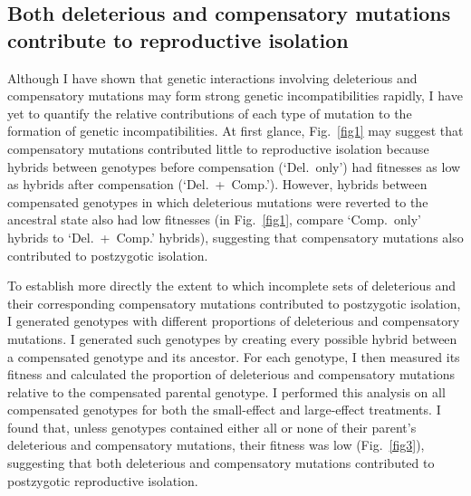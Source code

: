 \begin{doublespace}
\subsection{Both deleterious and compensatory mutations
  contribute to reproductive isolation}

Although I have shown that genetic interactions
involving deleterious and compensatory mutations
may form strong genetic incompatibilities rapidly,
I have yet to quantify the relative contributions
of each type of mutation to the formation of genetic incompatibilities.
%
At first glance, Fig.~\ref{fig1}
may suggest that compensatory mutations
contributed little to reproductive isolation
because hybrids between genotypes before compensation (`Del.~only')
had fitnesses as low as hybrids after compensation (`Del.~+~Comp.').
%
However, hybrids between compensated genotypes in which deleterious mutations
were reverted to the ancestral state also had low fitnesses
(in Fig.~\ref{fig1}, compare `Comp.~only' hybrids to `Del.~+~Comp.' hybrids),
suggesting that compensatory mutations
also contributed to postzygotic isolation.



To establish more directly the extent to which incomplete sets
of deleterious and their corresponding compensatory mutations
contributed to postzygotic isolation,
I generated genotypes with different proportions
of deleterious and compensatory mutations.
%
I generated such genotypes by creating every possible hybrid
between a compensated genotype and its ancestor.
%
For each genotype, I then measured its fitness and calculated
the proportion of deleterious and compensatory mutations
relative to the compensated parental genotype.
%
I performed this analysis on all compensated genotypes
for both the small-effect and large-effect treatments.
%
I found that, unless genotypes contained either
all or none of their parent's deleterious and compensatory mutations,
their fitness was low (Fig.~\ref{fig3}),
suggesting that both deleterious and compensatory mutations
contributed to postzygotic reproductive isolation.




\end{doublespace}
